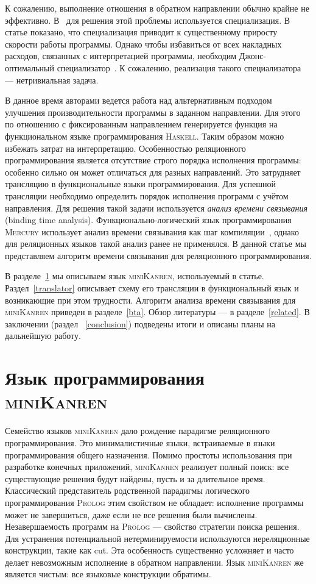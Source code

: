 \documentclass[conference,a4paper,american,russian]{IEEEtran}
\newcommand{\miniKanren}{\textsc{miniKanren}}
\newcommand{\mercury}{\textsc{Mercury}}
\newcommand{\haskell}{\textsc{Haskell}}
\newcommand{\prolog}{\textsc{Prolog}}
\begin{document}
К сожалению, выполнение отношения в обратном направлении обычно крайне не эффективно.
В~\cite{lozov2019relational} для решения этой проблемы используется специализация.
В статье показано, что специализация приводит к существенному приросту скорости работы программы.
Однако чтобы избавиться от всех накладных расходов, связанных с интерпретацией программы, необходим Джонс-оптимальный специализатор~\cite{jones1993partial}.
К сожалению, реализация такого специализатора --- нетривиальная задача.

В данное время авторами ведется работа над альтернативным подходом улучшения производительности программы в заданном направлении.
Для этого по отношению с фиксированным направлением генерируется функция на функциональном языке программирования \haskell{}.
Таким образом можно избежать затрат на интерпретацию.
Особенностью реляционного программирования является отсутствие строго порядка исполнения программы: особенно сильно он может отличаться для разных направлений.
Это затрудняет трансляцию в функциональные языки программирования.
Для успешной трансляции необходимо определить порядок исполнения программ с учётом направления.
Для решения такой задачи используется \textit{анализ времени связывания} (binding time analysis).
Функционально-логический язык программирования \mercury{} использует анализ времени связывания как шаг компиляции~\cite{vanhoof2004binding}, однако для реляционных языков такой анализ ранее не применялся.
В данной статье мы представляем алгоритм времени связывания для реляционного программирования.

В разделе~\ref{miniKanren} мы описываем язык \miniKanren{}, используемый в статье.
Раздел~\ref{translator} описывает схему его трансляции в функциональный язык и возникающие при этом трудности.
Алгоритм анализа времени связывания для \miniKanren{} приведен в разделе~\ref{bta}.
Обзор литературы --- в разделе~\ref{related}.
В заключении (раздел ~\ref{conclusion}) подведены итоги и описаны планы на дальнейшую работу.

\section{Язык программирования \miniKanren{}}\label{miniKanren}

Семейство языков \miniKanren{} дало рождение парадигме реляционного программирования.
Это минималистичные языки, встраиваемые в языки программирования общего назначения.
Помимо простоты использования при разработке конечных приложений, \miniKanren{} реализует полный поиск: все существующие решения будут найдены, пусть и за длительное время.
Классический представитель родственной парадигмы логического программирования \prolog{} этим свойством не обладает: исполнение программы может не завершиться, даже если не все решения были вычислены.
Незавершаемость программ на \prolog{} --- свойство стратегии поиска решения.
Для устранения потенциальной нетерминируемости используются нереляционные конструкции, такие как cut.
Эта особенность существенно усложняет и часто делает невозможным исполнение в обратном направлении.
Язык \miniKanren{} же является чистым: все языковые конструкции обратимы.
\end{document}
